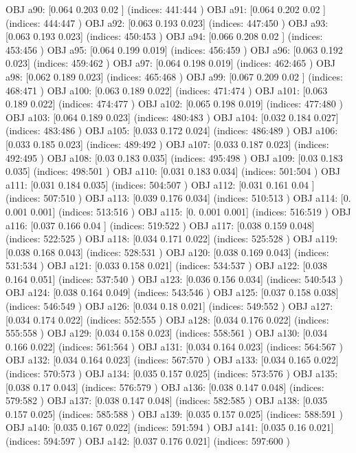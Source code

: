 OBJ a90: [0.064 0.203 0.02 ] (indices: 441:444 )
OBJ a91: [0.064 0.202 0.02 ] (indices: 444:447 )
OBJ a92: [0.063 0.193 0.023] (indices: 447:450 )
OBJ a93: [0.063 0.193 0.023] (indices: 450:453 )
OBJ a94: [0.066 0.208 0.02 ] (indices: 453:456 )
OBJ a95: [0.064 0.199 0.019] (indices: 456:459 )
OBJ a96: [0.063 0.192 0.023] (indices: 459:462 )
OBJ a97: [0.064 0.198 0.019] (indices: 462:465 )
OBJ a98: [0.062 0.189 0.023] (indices: 465:468 )
OBJ a99: [0.067 0.209 0.02 ] (indices: 468:471 )
OBJ a100: [0.063 0.189 0.022] (indices: 471:474 )
OBJ a101: [0.063 0.189 0.022] (indices: 474:477 )
OBJ a102: [0.065 0.198 0.019] (indices: 477:480 )
OBJ a103: [0.064 0.189 0.023] (indices: 480:483 )
OBJ a104: [0.032 0.184 0.027] (indices: 483:486 )
OBJ a105: [0.033 0.172 0.024] (indices: 486:489 )
OBJ a106: [0.033 0.185 0.023] (indices: 489:492 )
OBJ a107: [0.033 0.187 0.023] (indices: 492:495 )
OBJ a108: [0.03  0.183 0.035] (indices: 495:498 )
OBJ a109: [0.03  0.183 0.035] (indices: 498:501 )
OBJ a110: [0.031 0.183 0.034] (indices: 501:504 )
OBJ a111: [0.031 0.184 0.035] (indices: 504:507 )
OBJ a112: [0.031 0.161 0.04 ] (indices: 507:510 )
OBJ a113: [0.039 0.176 0.034] (indices: 510:513 )
OBJ a114: [0.    0.001 0.001] (indices: 513:516 )
OBJ a115: [0.    0.001 0.001] (indices: 516:519 )
OBJ a116: [0.037 0.166 0.04 ] (indices: 519:522 )
OBJ a117: [0.038 0.159 0.048] (indices: 522:525 )
OBJ a118: [0.034 0.171 0.022] (indices: 525:528 )
OBJ a119: [0.038 0.168 0.043] (indices: 528:531 )
OBJ a120: [0.038 0.169 0.043] (indices: 531:534 )
OBJ a121: [0.033 0.158 0.021] (indices: 534:537 )
OBJ a122: [0.038 0.164 0.051] (indices: 537:540 )
OBJ a123: [0.036 0.156 0.034] (indices: 540:543 )
OBJ a124: [0.038 0.164 0.049] (indices: 543:546 )
OBJ a125: [0.037 0.158 0.038] (indices: 546:549 )
OBJ a126: [0.034 0.18  0.021] (indices: 549:552 )
OBJ a127: [0.034 0.174 0.022] (indices: 552:555 )
OBJ a128: [0.034 0.176 0.022] (indices: 555:558 )
OBJ a129: [0.034 0.158 0.023] (indices: 558:561 )
OBJ a130: [0.034 0.166 0.022] (indices: 561:564 )
OBJ a131: [0.034 0.164 0.023] (indices: 564:567 )
OBJ a132: [0.034 0.164 0.023] (indices: 567:570 )
OBJ a133: [0.034 0.165 0.022] (indices: 570:573 )
OBJ a134: [0.035 0.157 0.025] (indices: 573:576 )
OBJ a135: [0.038 0.17  0.043] (indices: 576:579 )
OBJ a136: [0.038 0.147 0.048] (indices: 579:582 )
OBJ a137: [0.038 0.147 0.048] (indices: 582:585 )
OBJ a138: [0.035 0.157 0.025] (indices: 585:588 )
OBJ a139: [0.035 0.157 0.025] (indices: 588:591 )
OBJ a140: [0.035 0.167 0.022] (indices: 591:594 )
OBJ a141: [0.035 0.16  0.021] (indices: 594:597 )
OBJ a142: [0.037 0.176 0.021] (indices: 597:600 )
